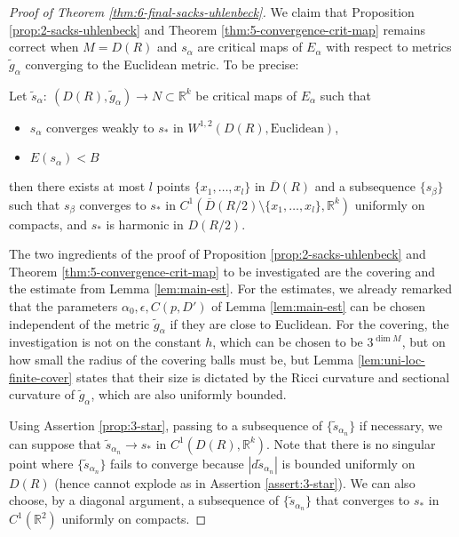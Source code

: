 \begin{proof}[Proof of Theorem \ref{thm:6-final-sacks-uhlenbeck}]
We claim that Proposition \ref{prop:2-sacks-uhlenbeck} and Theorem \ref{thm:5-convergence-crit-map} remains
correct when \(M=D(R)\) and \(s_\alpha\) are critical maps of \(E_\alpha\) with
respect to metrics \(\tilde g_\alpha\) converging to the Euclidean metric. To be
precise:


\begin{assertion}
\label{prop:3-star}
Let \(\tilde s_\alpha:\ (D(R),\tilde g_\alpha) \longrightarrow N\subset \mathbb{R}^k\)
be critical maps of \(E_\alpha\) such that
\begin{itemize}
\item \(s_\alpha\) converges weakly to \(s_*\) in \(W^{1,2}(D(R), \text{Euclidean})\),
\item \(E(s_\alpha) < B\)
\end{itemize}
then there exists at most \(l\) points \(\{x_1,\dots,x_l\}\) in \(\overline{D}(R)\)
and a subsequence \(\{s_\beta\}\) such that \(s_\beta\) converges to \(s_*\) in \(C^1(\overline{D}({R/2})\setminus
\{x_1,\dots, x_l\}, \mathbb{R}^k)\) uniformly on compacts, and \(s_*\) is harmonic in
\(D(R/2)\).
\end{assertion}


The two ingredients of the proof of Proposition \ref{prop:2-sacks-uhlenbeck} and
Theorem \ref{thm:5-convergence-crit-map} to be investigated are the covering and the estimate from Lemma
\ref{lem:main-est}. For the estimates, we already remarked that the parameters \(\alpha_0,\epsilon,C(p,D')\) of Lemma \ref{lem:main-est} can be chosen independent of the
metric \(\tilde g_\alpha\) if they are close to Euclidean. For the covering, the investigation is not on the constant
\(h\), which can be chosen to be
\(3^{\dim M}\), but on how small the radius of the covering balls must be, but Lemma
\ref{lem:uni-loc-finite-cover} states that their size is dictated by the Ricci curvature and
sectional curvature of \(\tilde g_\alpha\), which are also uniformly bounded.


Using Assertion \ref{prop:3-star}, passing to a subsequence of \(\{\tilde s_{\alpha_n}\}\)
if necessary, we can suppose that \(\tilde s_{\alpha_n} \to s_*\) in \(C^1(D(R),
\mathbb{R}^k)\). Note that there is no singular point where \(\{\tilde s_{\alpha_n}\}\) fails to converge because \(|d\tilde s_{\alpha_n}|\) is bounded uniformly on \(D(R)\) (hence cannot explode as in Assertion \ref{assert:3-star}). We can also choose, by a
diagonal argument, a
subsequence of \(\{\tilde s_{\alpha_n}\}\) that converges to \(s_*\) in \(C^1(\mathbb{R}^2)\) uniformly on compacts.


\end{proof}
